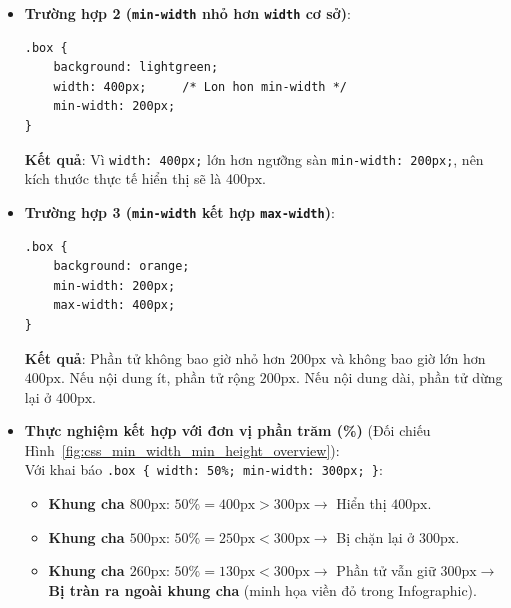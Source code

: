 \documentclass[11pt,oneside]{book}
\newcommand{\codeinline}[1]{\textcolor{accentOrange}{\texttt{#1}}}
\begin{document}
\begin{itemize}[leftmargin=1.5em, itemsep=4pt, parsep=0pt]
    \item \textbf{Trường hợp 2 (\codeinline{min-width} nhỏ hơn \codeinline{width} cơ sở)}:
    \begin{codeWindow}
\begin{lstlisting}[language=CSS3]
.box {
    background: lightgreen;
    width: 400px;     /* Lon hon min-width */
    min-width: 200px;
}
\end{lstlisting}
    \end{codeWindow}
    \textbf{Kết quả}: Vì \codeinline{width: 400px;} lớn hơn ngưỡng sàn \codeinline{min-width: 200px;}, nên kích thước thực tế hiển thị sẽ là $400\text{px}$.

    \item \textbf{Trường hợp 3 (\codeinline{min-width} kết hợp \codeinline{max-width})}:
    \begin{codeWindow}
\begin{lstlisting}[language=CSS3]
.box {
    background: orange;
    min-width: 200px;
    max-width: 400px;
}
\end{lstlisting}
    \end{codeWindow}
    \textbf{Kết quả}: Phần tử không bao giờ nhỏ hơn $200\text{px}$ và không bao giờ lớn hơn $400\text{px}$. Nếu nội dung ít, phần tử rộng $200\text{px}$. Nếu nội dung dài, phần tử dừng lại ở $400\text{px}$.

    \item \textbf{Thực nghiệm kết hợp với đơn vị phần trăm (\%)} (Đối chiếu Hình~\ref{fig:css_min_width_min_height_overview}):\\
    Với khai báo \codeinline{.box \{ width: 50\%; min-width: 300px; \}}:
    \begin{itemize}[leftmargin=1.2em, itemsep=2pt, parsep=0pt]
        \item \textbf{Khung cha $800\text{px}$}: $50\% = 400\text{px} > 300\text{px} \rightarrow$ Hiển thị $400\text{px}$.
        \item \textbf{Khung cha $500\text{px}$}: $50\% = 250\text{px} < 300\text{px} \rightarrow$ Bị chặn lại ở $300\text{px}$.
        \item \textbf{Khung cha $260\text{px}$}: $50\% = 130\text{px} < 300\text{px} \rightarrow$ Phần tử vẫn giữ $300\text{px} \rightarrow$ \textbf{Bị tràn ra ngoài khung cha} (minh họa viền đỏ trong Infographic).
    \end{itemize}
\end{itemize}
\end{document}
